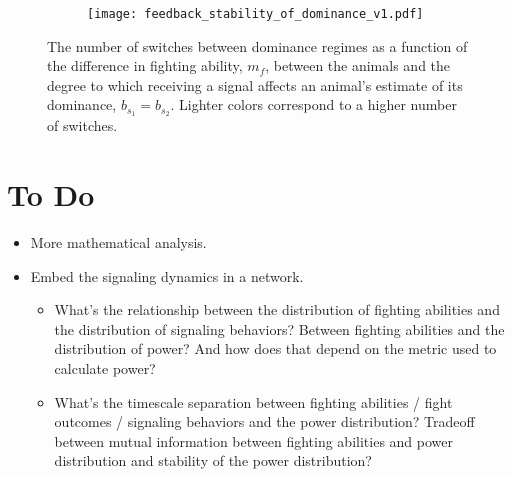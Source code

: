 \documentclass{article}
\begin{document}
\begin{figure}
\begin{subfigure}{1 \textwidth}
\begin{center}
\texttt{[image: feedback\_stability\_of\_dominance\_v1.pdf]}
\end{center}
\end{subfigure}
\caption{\label{diff_switches} The number of switches between dominance regimes as a function of the difference in fighting ability, $m_f$, between the animals and the degree to which receiving a signal affects an animal's estimate of its dominance, $b_{s_1}=b_{s_2}$.  Lighter colors correspond to a higher number of switches.  }
\end{figure}

\section{To Do }

\begin{itemize}
\item More mathematical analysis.
\item Embed the signaling dynamics in a network.  
\begin{itemize}
\item What's the relationship between the distribution of fighting abilities and the distribution of signaling behaviors?  Between fighting abilities and the distribution of power?  And how does that depend on the metric used to calculate power?
\item What's the timescale separation between fighting abilities / fight outcomes / signaling behaviors and the power distribution?  Tradeoff between mutual information between fighting abilities and power distribution and stability of the power distribution?
\end{itemize}
\end{itemize}



\nocite{*}


\end{document}
